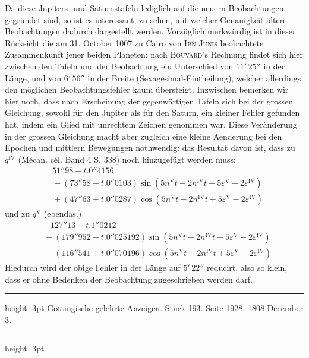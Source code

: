 Da diese Jupiters- und Saturnstafeln lediglich auf die neuern Beobachtungen gegründet sind, so ist es interessant, zu sehen, mit welcher Genauigkeit ältere Beobachtungen dadurch dargestellt werden. Vorzüglich merkwürdig ist in dieser Rücksicht die am 31. October 1007 zu Cairo von \textsc{Ibn Junis} beobachtete Zusammenkunft jener beiden Planeten; nach \textsc{Bouvard}'s Rechnung findet sich hier zwischen den Tafeln und der Beobachtung ein Unterschied von $11'\,25''$ in der Länge, und von $6'\,56''$ in der Breite (Sexagesimal-Eintheilung), welcher allerdings den möglichen Beobachtungsfehler kaum übersteigt. Inzwischen bemerken wir hier noch, dass nach Erscheinung der gegenwärtigen Tafeln sich bei der grossen Gleichung, sowohl für den Jupiter als für den Saturn, ein kleiner Fehler gefunden hat, indem ein Glied mit unrechtem Zeichen genommen war. Diese Veränderung in der grossen Gleichung macht aber zugleich eine kleine Aenderung bei den Epochen und mittlern Bewegungen nothwendig: das Resultat davon ist, dass zu $q^{\mathrm{IV}}$ (Mécan. cél. Band 4 S. 338) noch hinzugefügt werden muss:
\[
\begin{aligned}
&51''98 + t.0''4156\\
&{}- (73''58 - t.0''0103)\sin(5n^{\mathrm{V}}t - 2n^{\mathrm{IV}}t + 5\varepsilon^{\mathrm{V}} - 2\varepsilon^{\mathrm{IV}})\\
&{}+ (47''63 + t.0''0287)\cos(5n^{\mathrm{V}}t - 2n^{\mathrm{IV}}t + 5\varepsilon^{\mathrm{V}} - 2\varepsilon^{\mathrm{IV}})
\end{aligned}
\]
und zu $q^{\mathrm{V}}$ (ebendas.)
\[
\begin{aligned}
&-127''13 - t.1''0212\\
&{}+ (179''952 - t.0''025192)\sin(5n^{\mathrm{V}}t - 2n^{\mathrm{IV}}t + 5\varepsilon^{\mathrm{V}} - 2\varepsilon^{\mathrm{IV}})\\
&{}- (116''541 + t.0''070196)\cos(5n^{\mathrm{V}}t - 2n^{\mathrm{IV}}t + 5\varepsilon^{\mathrm{V}} - 2\varepsilon^{\mathrm{IV}})
\end{aligned}
\]
Hiedurch wird der obige Fehler in der Länge auf $5'\,22''$ reducirt, also so klein, dass er ohne Bedenken der Beobachtung zugeschrieben werden darf.

\par\bigskip
\hypertarget{native-514-lower}{}\label{native-514-lower}
\begin{center}\parbox{.85\linewidth}{\centering\small
\hrule height .3pt\relax\vspace{2.5pt}
Göttingische gelehrte Anzeigen. Stück 193. Seite 1928. 1808 December 3.\par
\vspace{2.5pt}\hrule height .3pt\relax
}\end{center}

